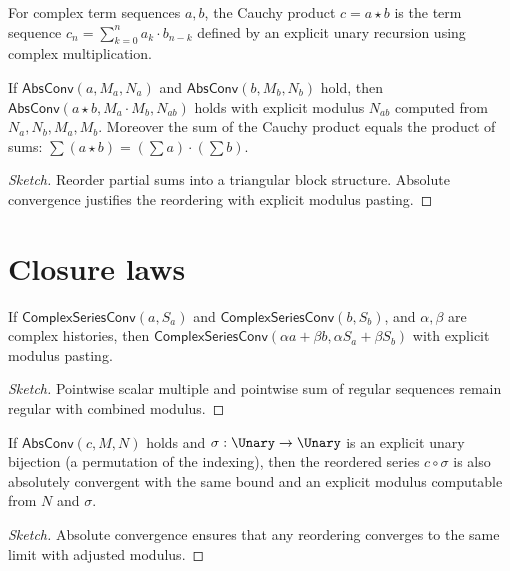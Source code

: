 \begin{definition}
\label{def:cauchy-product}
For complex term sequences \(a, b\), the Cauchy product \(c = a \star b\) is the term sequence \(c_n = \sum_{k = 0}^{n} a_k \cdot b_{n-k}\) defined by an explicit unary recursion using complex multiplication.
\end{definition}

\begin{theorem}
\label{thm:cauchy-product-conv}
If \(\mathsf{AbsConv}(a, M_a, N_a)\) and \(\mathsf{AbsConv}(b, M_b, N_b)\) hold, then \(\mathsf{AbsConv}(a \star b, M_a \cdot M_b, N_{ab})\) holds with explicit modulus \(N_{ab}\) computed from \(N_a, N_b, M_a, M_b\). Moreover the sum of the Cauchy product equals the product of sums: \(\sum (a \star b) = (\sum a) \cdot (\sum b)\).
\end{theorem}
\begin{proof}[Sketch]
Reorder partial sums into a triangular block structure. Absolute convergence justifies the reordering with explicit modulus pasting.
\end{proof}

\section{Closure laws}

\begin{lemma}
\label{lem:linearity-of-conv}
If \(\mathsf{ComplexSeriesConv}(a, S_a)\) and \(\mathsf{ComplexSeriesConv}(b, S_b)\), and \(\alpha, \beta\) are complex histories, then \(\mathsf{ComplexSeriesConv}(\alpha a + \beta b, \alpha S_a + \beta S_b)\) with explicit modulus pasting.
\end{lemma}
\begin{proof}[Sketch]
Pointwise scalar multiple and pointwise sum of regular sequences remain regular with combined modulus.
\end{proof}

\begin{lemma}
\label{lem:reordering-abs-conv}
If \(\mathsf{AbsConv}(c, M, N)\) holds and \(\sigma : \Unary \to \Unary\) is an explicit unary bijection (a permutation of the indexing), then the reordered series \(c \circ \sigma\) is also absolutely convergent with the same bound and an explicit modulus computable from \(N\) and \(\sigma\).
\end{lemma}
\begin{proof}[Sketch]
Absolute convergence ensures that any reordering converges to the same limit with adjusted modulus.
\end{proof}


